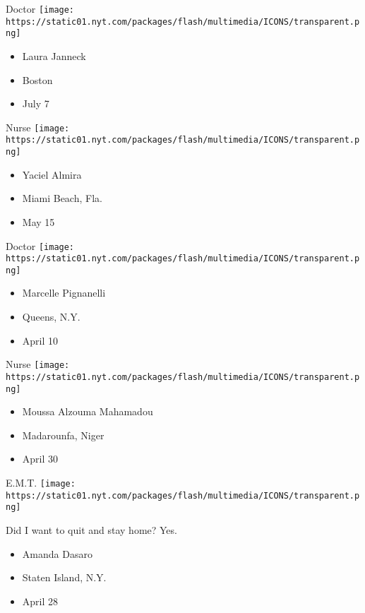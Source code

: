 \protect\hyperlink{item-laura-janneck}{}

Doctor
\texttt{[image: https://static01.nyt.com/packages/flash/multimedia/ICONS/transparent.png]}

\begin{itemize}
\tightlist
\item
  Laura Janneck
\item
  Boston
\item
  July 7
\end{itemize}

\protect\hyperlink{item-yaciel-almira}{}

Nurse
\texttt{[image: https://static01.nyt.com/packages/flash/multimedia/ICONS/transparent.png]}

\begin{itemize}
\tightlist
\item
  Yaciel Almira
\item
  Miami Beach, Fla.
\item
  May 15
\end{itemize}

\protect\hyperlink{item-marcelle-pignanelli}{}

Doctor
\texttt{[image: https://static01.nyt.com/packages/flash/multimedia/ICONS/transparent.png]}

\begin{itemize}
\tightlist
\item
  Marcelle Pignanelli
\item
  Queens, N.Y.
\item
  April 10
\end{itemize}

\protect\hyperlink{item-moussa-alzouma-mahamadou}{}

Nurse
\texttt{[image: https://static01.nyt.com/packages/flash/multimedia/ICONS/transparent.png]}

\begin{itemize}
\tightlist
\item
  Moussa Alzouma Mahamadou
\item
  Madarounfa, Niger
\item
  April 30
\end{itemize}

\protect\hyperlink{item-amanda-dasaro}{}

E.M.T.
\texttt{[image: https://static01.nyt.com/packages/flash/multimedia/ICONS/transparent.png]}

Did I want to quit and stay home? Yes.

\begin{itemize}
\tightlist
\item
  Amanda Dasaro
\item
  Staten Island, N.Y.
\item
  April 28
\end{itemize}

